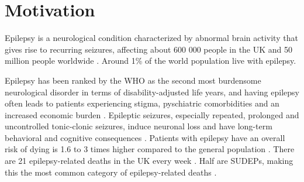 \section{Motivation}

Epilepsy is a neurological condition characterized by abnormal brain activity that gives rise to recurring seizures, affecting about 600 000 people in the UK and 50 million people worldwide \cite{nice_epilepsies_2012,fiest_prevalence_2017}.
Around 1\% of the world population live with epilepsy.

Epilepsy has been ranked by the \ac{WHO} as the second most burdensome neurological disorder in terms of disability-adjusted life years, and
having epilepsy often leads to patients experiencing stigma, pyschiatric comorbidities and an increased economic burden \cite{fiest_prevalence_2017}.
Epileptic seizures, especially repeated, prolonged and uncontrolled tonic-clonic seizures, induce neuronal loss and have long-term behavioral and cognitive consequences \cite{sutula_epileptic_2003}.
Patients with epilepsy have an overall risk of dying is 1.6 to 3 times higher compared to the general population \cite{forsgren_mortality_2005}.
There are 21 epilepsy-related deaths in the UK every week%
.
Half are \acp{SUDEP},  %
making this the most common category of epilepsy-related deaths \cite{devinsky_sudden_2016}.





